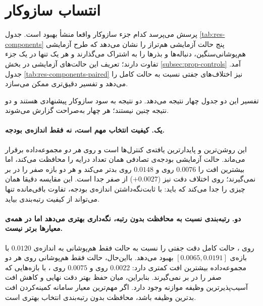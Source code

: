 \section{انتساب سازوکار }
\label{subsec:res-components}

پرسش  می‌پرسد کدام جزء سازوکار واقعا منشأ بهبود است. جدول \ref{tab:res-components} پنج حالت آزمایشی هم‌تراز را نشان می‌دهد که طرح آزمایشی هم‌پوشانی‌سنگین، دنباله‌ها و بذرها را به اشتراک می‌گذارند و هر یک تنها در یک جزء تفاوت دارند؛ تعریف این حالت‌های آزمایشی در بخش \ref{subsec:prop-controls} آمد. جدول \ref{tab:res-components-paired} نیز اختلاف‌های جفتی نسبت به حالت کامل را می‌دهد و تفسیر دقیق‌تری ممکن می‌سازد.





تفسیر این دو جدول چهار نتیجه می‌دهد. دو نتیجه به سود سازوکار پیشنهادی هستند و دو نتیجه چنین نیستند؛ هر چهار به‌صراحت گزارش می‌شوند.

\paragraph{یک. کیفیت انتخاب مهم است، نه فقط اندازه‌ی بودجه.} این روشن‌ترین و پایدارترین یافته‌ی کنترل‌ها است و روی \emph{هر دو} مجموعه‌داده برقرار می‌ماند. حالت آزمایشی بودجه‌ی تصادفی همان تعداد درایه را محافظت می‌کند، اما بیشترین افت را $0.0076$ روی  و $0.0148$ روی  بدتر می‌کند و هر دو بازه صفر را در بر نمی‌گیرند؛ روی  اختلاف دقت نیز ($+0.0027$) از صفر جدا است. این مقایسه دقیقا همان چیزی را جدا می‌کند که باید: با ثابت‌نگه‌داشتن اندازه‌ی بودجه، تفاوت باقی‌مانده تنها می‌تواند از کیفیت رتبه‌بندی بیاید.

\paragraph{دو. رتبه‌بندی نسبت به محافظت بدون رتبه، نگه‌داری بهتری می‌دهد اما در همه‌ی معیارها برتر نیست.} روی ، حالت کامل دقت جفتی را نسبت به حالت فقط هم‌پوشانی به اندازه‌ی $0.0120$ با بازه‌ی $[0.0065,0.0191]$ بهبود می‌دهد. بااین‌حال، حالت فقط هم‌پوشانی روی هر دو مجموعه‌داده بیشترین افت کمتری دارد: $0.0022$ روی  و $0.0075$ روی ، با بازه‌هایی که صفر را در بر نمی‌گیرند. بنابراین، میان حفظ بهتر دقت نهایی و کاهش افت آسیب‌پذیرترین وظیفه موازنه وجود دارد. اگر مهم‌ترین معیار سامانه کمینه‌کردن افت بدترین وظیفه باشد، محافظت بدون رتبه‌بندی انتخاب بهتری است.

